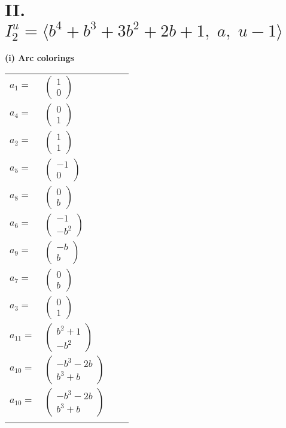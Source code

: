 \documentclass[1p]{elsarticle_modified}
\theoremstyle{definition}
\begin{document}
\centering \section*{II. $I^u_{2}= \langle b^4+b^3+3 b^2+2 b+1,\;a,\;u-1 \rangle$}
\flushleft \textbf{(i) Arc colorings}\\
\begin{tabular}{m{7pt} m{180pt} m{7pt} m{180pt} }
\flushright $a_{1}=$&$\begin{pmatrix}1\\0\end{pmatrix}$ \\
\flushright $a_{4}=$&$\begin{pmatrix}0\\1\end{pmatrix}$ \\
\flushright $a_{2}=$&$\begin{pmatrix}1\\1\end{pmatrix}$ \\
\flushright $a_{5}=$&$\begin{pmatrix}-1\\0\end{pmatrix}$ \\
\flushright $a_{8}=$&$\begin{pmatrix}0\\b\end{pmatrix}$ \\
\flushright $a_{6}=$&$\begin{pmatrix}-1\\- b^2\end{pmatrix}$ \\
\flushright $a_{9}=$&$\begin{pmatrix}- b\\b\end{pmatrix}$ \\
\flushright $a_{7}=$&$\begin{pmatrix}0\\b\end{pmatrix}$ \\
\flushright $a_{3}=$&$\begin{pmatrix}0\\1\end{pmatrix}$ \\
\flushright $a_{11}=$&$\begin{pmatrix}b^2+1\\- b^2\end{pmatrix}$ \\
\flushright $a_{10}=$&$\begin{pmatrix}- b^3-2 b\\b^3+b\end{pmatrix}$\\ \flushright $a_{10}=$&$\begin{pmatrix}- b^3-2 b\\b^3+b\end{pmatrix}$\\&\end{tabular}
\end{document}
